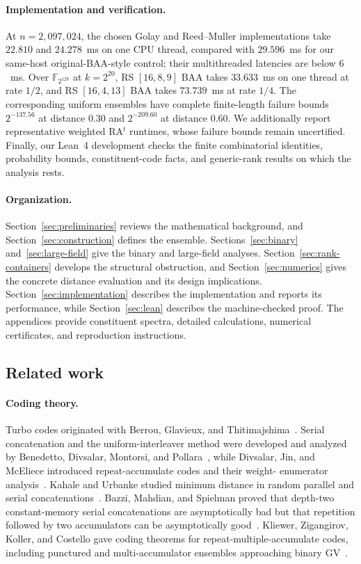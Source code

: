 \documentclass[runningheads,envcountsame,envcountsect]{llncs}
\newcommand{\F}{\mathbb F}
\begin{document}
\paragraph{Implementation and verification.}
At $n=2{,}097{,}024$, the chosen Golay and Reed--Muller implementations take
 $22.810$ and $24.278$~ms on one CPU thread, compared with $29.596$~ms for our
 same-host original-BAA-style control; their multithreaded latencies are below
 $6$~ms.  Over $\F_{2^{128}}$ at $k=2^{20}$, RS $[16,8,9]$ BAA takes
 $33.633$~ms on one thread at rate $1/2$, and RS $[16,4,13]$ BAA takes
 $73.739$~ms at rate $1/4$.  The corresponding uniform ensembles have
 complete finite-length failure bounds $2^{-137.56}$ at distance $0.30$
 and $2^{-209.60}$ at distance $0.60$.  We additionally report representative
 weighted RA$^t$ runtimes, whose failure bounds remain uncertified.  Finally, our Lean~4 development checks the finite combinatorial
identities, probability bounds, constituent-code facts, and generic-rank
results on which the analysis rests.

\paragraph{Organization.}
Section~\ref{sec:preliminaries} reviews the mathematical background,
and Section~\ref{sec:construction} defines the ensemble.
Sections~\ref{sec:binary} and~\ref{sec:large-field} give the binary and
large-field analyses.
Section~\ref{sec:rank-containers} develops the structural obstruction, and
Section~\ref{sec:numerics} gives the concrete distance evaluation and its design
implications.
Section~\ref{sec:implementation} describes the implementation and reports its
performance, while Section~\ref{sec:lean} describes the machine-checked proof.
The appendices provide constituent spectra, detailed calculations, numerical
certificates, and reproduction instructions.

\subsection{Related work}

\paragraph{Coding theory.}
Turbo codes originated with Berrou, Glavieux, and Thitimajshima~\cite{berrou93}.
Serial concatenation and the uniform-interleaver method were developed and
analyzed by Benedetto, Divsalar, Montorsi, and Pollara~\cite{benedetto98}, while
Divsalar, Jin, and McEliece introduced repeat-accumulate codes and their weight-
enumerator analysis~\cite{divsalar98}.  Kahale and Urbanke studied minimum
distance in random parallel and serial concatenations~\cite{kahale98}.
Bazzi, Mahdian, and Spielman proved that depth-two constant-memory serial
concatenations are asymptotically bad but that repetition followed by two
accumulators can be asymptotically good~\cite{bms09}.  Kliewer, Zigangirov,
Koller, and Costello gave coding theorems for repeat-multiple-accumulate codes,
including punctured and multi-accumulator ensembles approaching binary
GV~\cite{kliewer08}.
\end{document}
